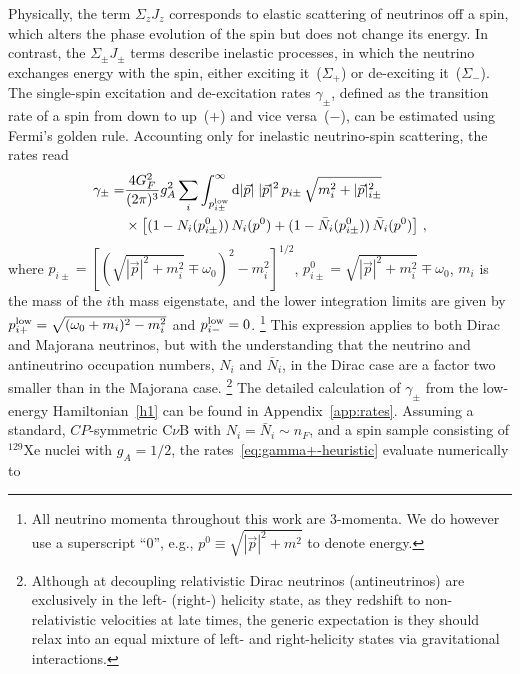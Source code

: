 \documentclass[aps,prd,10pt,twocolumn,superscriptaddress,floatfix,nofootinbib,amsmath,amssymb,altaffilletter,preprintnumbers]{revtex4-1}
\begin{document}
Physically, the term $\Sigma_z J_z$ corresponds to elastic scattering of neutrinos off a spin, which alters the phase evolution of the spin but does not change its energy. In contrast, the $\Sigma_\pm J_\pm$ terms describe inelastic processes, in which the neutrino exchanges energy with the spin, either exciting it~($\Sigma_+$) or de-exciting it~($\Sigma_-$).  The single-spin excitation and de-excitation rates $\gamma_\pm$, defined as the  transition rate of a spin from down to up~($+$) and vice versa~($-$), can be estimated using Fermi's golden rule.  Accounting only for inelastic neutrino-spin scattering, the rates read 
%
\begin{equation}
\begin{aligned}
    \gamma_{\pm}=&\frac{ 4 G_F^2}{(2 \pi)^3}  g_A^2 \sum_i
    \int_{p^{\rm low}_{i\pm}}^\infty  {\rm d} |\vec{p}|\;|\vec{p}|^2\, p_{i\pm}\, \sqrt{m_i^2+|\vec{p}|^2_{i \pm}}  \\
    &\times\left[(1-N_{i}(p^0_{i\pm})) \, N_{i}(p^0)  +(1-\bar{N}_{i}(p^0_{i\pm}))\, \bar{N}_{i}(p^0)\right]\,,
    \label{eq:gamma+-heuristic}
\end{aligned}
\end{equation}
where $p_{i\pm}=[(\sqrt{|\vec{p}|^2+m_i^2}\mp \omega_0)^2-m_i^2]^{1/2}$, $p^0_{i\pm}=\sqrt{|\vec{p}|^2+m_i^2} \mp \omega_0$, $m_i$ is the mass of the $i$th mass eigenstate, and the lower integration limits are  given by $p^{\rm low}_{i+}=\sqrt{(\omega_0+ m_i)^2-m_i^2}$ and $p^{\rm low}_{i-}=0$.%
%
\footnote{All neutrino momenta throughout this work are 3-momenta.  We do however use a superscript ``0'', e.g., $p^0 \equiv \sqrt{|\vec{p}|^2+m^2}$ to denote energy.}
%
 This expression applies to both Dirac and Majorana neutrinos, but with the understanding that the neutrino and antineutrino occupation numbers, $N_i$ and $\bar{N}_i$, in the Dirac case are a factor two smaller than in the Majorana case.%
%
\footnote{Although at decoupling relativistic Dirac neutrinos (antineutrinos) are exclusively in the left- (right-) helicity state, as they redshift to non-relativistic velocities at late times, the generic expectation is  they should relax into an equal mixture of left- and right-helicity states via gravitational interactions.}
%
The detailed calculation of $\gamma_{\pm}$ from the low-energy Hamiltonian~\eqref{h1} can  be found in Appendix~\ref{app:rates}. 
Assuming a standard, $CP$-symmetric C$\nu$B with $N_i = \bar{N}_i \sim n_F$, and a spin sample consisting of  $^{129}\mathrm{Xe}$ nuclei with $g_A= 1/2$, the rates~\eqref{eq:gamma+-heuristic} evaluate numerically to
\end{document}
